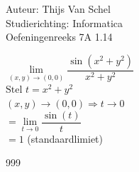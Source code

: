 \documentclass[a4paper]{article}
\begin{document}
  
\noindent \large Auteur: Thijs Van Schel \\
\noindent \large Studierichting: Informatica\\
\noindent \large Oefeningenreeks 7A 1.14\\

\medskip

\normalsize

$\lim\limits_{(x,y) \to (0,0)} \dfrac{\sin(x^2+y^2)}{x^2+y^2}$ \\

$\text{Stel } t = x^2 + y^2$ \\

$(x,y) \to (0,0) \Rightarrow t \to 0$ \\

$= \lim\limits_{t \to 0} \dfrac{\sin(t)}{t}$ \\

$= 1$ (standaardlimiet)

\begin{thebibliography}{999}
\end{thebibliography}
\end{document}
